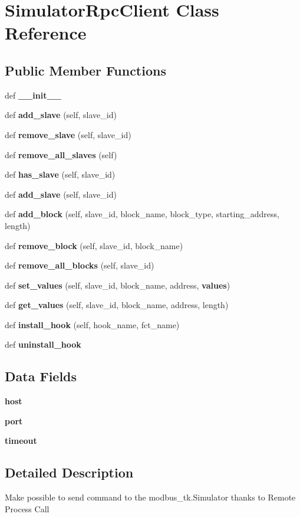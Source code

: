 \section{Simulator\+Rpc\+Client Class Reference}
\label{classmodbus__tk_1_1simulator__rpc__client_1_1_simulator_rpc_client}
\subsection*{Public Member Functions}
\begin{DoxyCompactItemize}
\item 
def {\bf \+\_\+\+\_\+init\+\_\+\+\_\+}
\item 
def {\bf add\+\_\+slave} (self, slave\+\_\+id)
\item 
def {\bf remove\+\_\+slave} (self, slave\+\_\+id)
\item 
def {\bf remove\+\_\+all\+\_\+slaves} (self)
\item 
def {\bf has\+\_\+slave} (self, slave\+\_\+id)
\item 
def {\bf add\+\_\+slave} (self, slave\+\_\+id)
\item 
def {\bf add\+\_\+block} (self, slave\+\_\+id, block\+\_\+name, block\+\_\+type, starting\+\_\+address, length)
\item 
def {\bf remove\+\_\+block} (self, slave\+\_\+id, block\+\_\+name)
\item 
def {\bf remove\+\_\+all\+\_\+blocks} (self, slave\+\_\+id)
\item 
def {\bf set\+\_\+values} (self, slave\+\_\+id, block\+\_\+name, address, {\bf values})
\item 
def {\bf get\+\_\+values} (self, slave\+\_\+id, block\+\_\+name, address, length)
\item 
def {\bf install\+\_\+hook} (self, hook\+\_\+name, fct\+\_\+name)
\item 
def {\bf uninstall\+\_\+hook}
\end{DoxyCompactItemize}
\subsection*{Data Fields}
\begin{DoxyCompactItemize}
\item 
{\bf host}
\item 
{\bf port}
\item 
{\bf timeout}
\end{DoxyCompactItemize}


\subsection{Detailed Description}
\begin{DoxyVerb}Make possible to send command to the modbus_tk.Simulator thanks to Remote Process Call\end{DoxyVerb}
 

